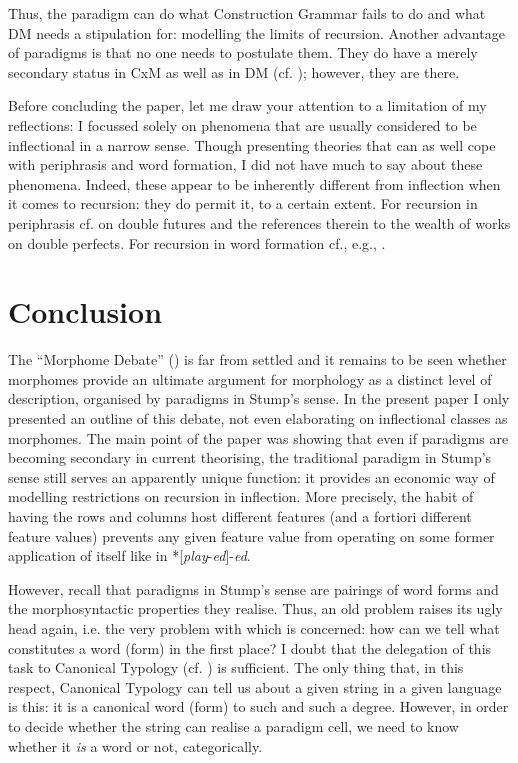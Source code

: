 \documentclass[output=paper]{langsci/langscibook}
\begin{document}
Thus, the paradigm can do what Construction Grammar fails to do and what DM needs a stipulation for: modelling the limits of recursion. Another advantage of paradigms is that no one needs to postulate them. They do have a merely secondary status in CxM as well as in DM (cf. ); however, they are there.

Before concluding the paper, let me draw your attention to a limitation of my reflections: I focussed solely on phenomena that are usually considered to be inflectional in a narrow sense. Though presenting theories that can as well cope with periphrasis and word formation, I did not have much to say about these phenomena. Indeed, these appear to be inherently different from inflection when it comes to recursion: they do permit it, to a certain extent. For recursion in periphrasis cf. \citet{Rothstein2012, Rothstein2013, Rothstein2013b} on double futures and the references therein to the wealth of works on double perfects. For recursion in word formation cf., e.g., \citet{BratticoEtAl2007}.

\section{Conclusion} \label{reiner:5}\largerpage

The “Morphome Debate” (\citealt{LuísEtAl2016}) is far from settled and it remains to be seen whether morphomes provide an ultimate argument for morphology as a distinct level of description, organised by paradigms in Stump’s sense. In the present paper I only presented an outline of this debate, not even elaborating on inflectional classes as morphomes. The main point of the paper was showing that even if paradigms are becoming secondary in current theorising, the traditional paradigm in Stump’s sense still serves an apparently unique function: it provides an economic way of modelling restrictions on recursion in inflection. More precisely, the habit of having the rows and columns host different features (and a fortiori different feature values) prevents any given feature value from operating on some former application of itself like in *[\textit{play}{}-\textit{ed}]-\textit{ed}.

However, recall that paradigms in Stump’s sense are pairings of word forms and the morphosyntactic properties they realise. Thus, an old problem raises its ugly head again, i.e. the very problem with which \citet{Haspelmath2011} is concerned: how can we tell what constitutes a word (form) in the first place? I doubt that the delegation of this task to Canonical Typology (cf. ) is sufficient. The only thing that, in this respect, Canonical Typology can tell us about a given string in a given language is this: it is a canonical word (form) to such and such a degree. However, in order to decide whether the string can realise a paradigm cell, we need to know whether it \textit{is} a word or not, categorically.
\end{document}
